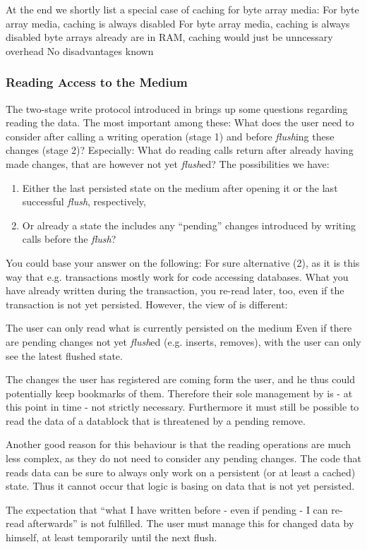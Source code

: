 At the end we shortly list a special case of caching for byte array media:
{%
For byte array media, caching is always disabled
}
{%
For byte array media, caching is always disabled
}
{%
byte arrays already are in RAM, caching would just be unncessary overhead
}
{%
No disadvantages known
}


\subsubsection{Reading Access to the Medium}%
\label{sec:LesenderZugriffaufdasMedium}%

The two-stage write protocol introduced in  brings up some questions regarding reading the data. The most important among these: What does the user need to consider after calling a writing operation (stage 1) and before \emph{flush}ing these changes (stage 2)? Especially: What do reading calls return after already having made changes, that are however not yet \emph{flush}ed? The possibilities we have:
\begin{enumerate}
\item Either the last persisted state on the medium after opening it or the last successful \emph{flush}, respectively,
\item Or already a state the includes any ``pending'' changes introduced by writing calls before the \emph{flush}?
\end{enumerate}
 
You could base your answer on the following: For sure alternative (2), as it is this way that e.g. transactions mostly work for code accessing databases. What you have already written during the transaction, you re-read later, too, even if the transaction is not yet persisted. However, the view of \LibName{} is different:

{%
The user can only read what is currently persisted on the medium
}
{%
Even if there are pending changes not yet \emph{flush}ed (e.g. inserts, removes), with \COMPmedia{} the user can only see the latest flushed state.
}
{%
The changes the user has registered are coming form the user, and he thus could potentially keep bookmarks of them. Therefore their sole management by \COMPmedia{} is - at this point in time - not strictly necessary. Furthermore it must still be possible to read the data of a datablock that is threatened by a pending remove. 

Another good reason for this behaviour is that  the reading operations are much less complex, as they do not need to consider any pending changes. The code that reads data can be sure to always only work on a persistent (or at least a cached) state. Thus it cannot occur that logic is basing on data that is not yet persisted.
}
{%
The expectation that ``what I have written before - even if pending - I can re-read afterwards'' is not fulfilled. The user must manage this for changed data by himself, at least temporarily until the next flush. 
}

